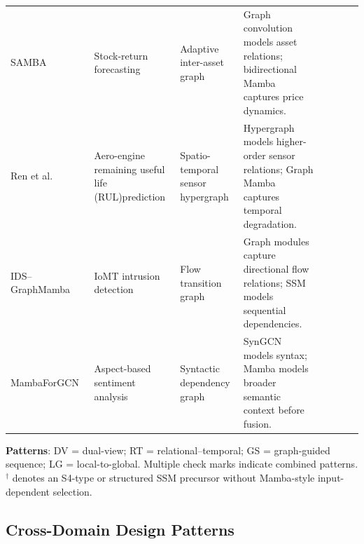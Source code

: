\documentclass[acmsmall]{acmart}
\newcommand{\cmark}{\ding{51}}
\begin{document}
\begin{landscape}
\begin{longtable}{@{}
p{2.2cm}
p{2.8cm}
p{3.8cm}
p{7cm}
cccc
@{}}
SAMBA~\cite{mehrabian2024mamba} &
Stock-return forecasting &
Adaptive inter-asset graph &
Graph convolution models asset relations; bidirectional Mamba captures price dynamics. &
& \cmark & & \\

Ren et al.~\cite{ren2026spatio} &
Aero-engine remaining useful life (RUL)prediction &
Spatio-temporal sensor hypergraph &
Hypergraph models higher-order sensor relations; Graph Mamba captures temporal degradation. &
& \cmark & & \\

IDS--GraphMamba~\cite{atitallah2025ids} &
IoMT intrusion detection &
Flow transition graph &
Graph modules capture directional flow relations; SSM models sequential dependencies. &
& \cmark & & \\

MambaForGCN~\cite{lawan2024mambaforgcn} &
Aspect-based sentiment analysis &
Syntactic dependency graph &
SynGCN models syntax; Mamba models broader semantic context before fusion. &
\cmark & & & \\

\end{longtable}

\vspace{-2mm}

\begin{center}
\footnotesize
\textbf{Patterns}: DV = dual-view; RT = relational--temporal;
GS = graph-guided sequence; LG = local-to-global.
Multiple check marks indicate combined patterns.
$^{\dagger}$ denotes an S4-type or structured SSM precursor without
Mamba-style input-dependent selection.
\end{center}

\end{landscape}

 
\subsection{Cross-Domain Design Patterns}
\label{sec:cross-domain-patterns}
\end{document}
